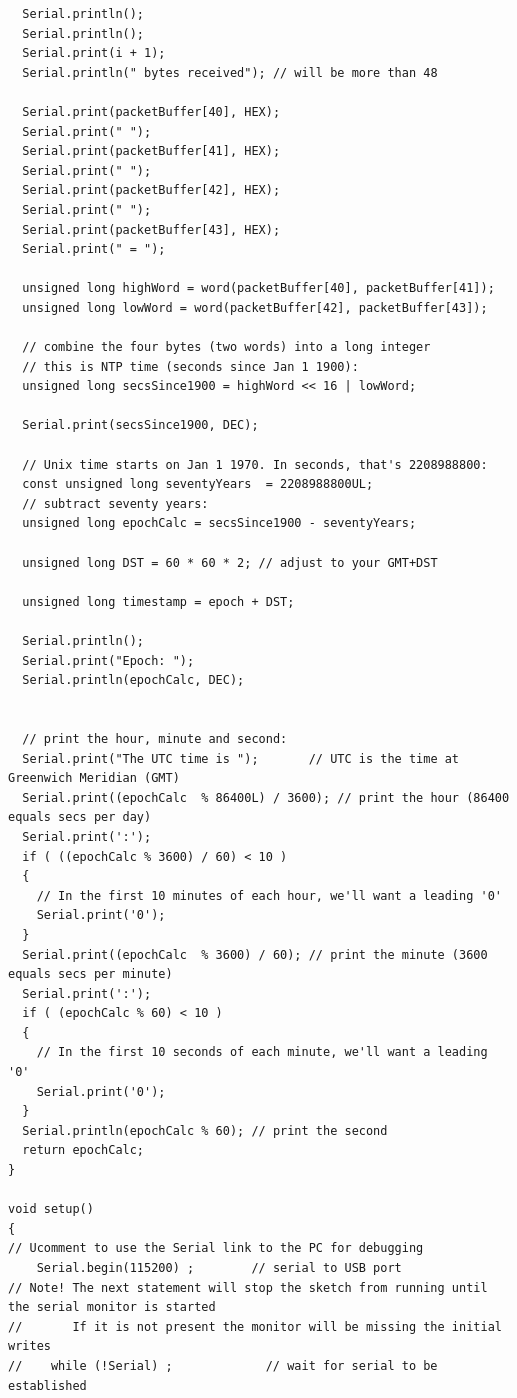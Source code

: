 \documentclass[12pt,a4paper]{report}
\begin{document}
\begin{lstlisting}
  Serial.println();
  Serial.println();
  Serial.print(i + 1);
  Serial.println(" bytes received"); // will be more than 48

  Serial.print(packetBuffer[40], HEX);
  Serial.print(" ");
  Serial.print(packetBuffer[41], HEX);
  Serial.print(" ");
  Serial.print(packetBuffer[42], HEX);
  Serial.print(" ");
  Serial.print(packetBuffer[43], HEX);
  Serial.print(" = ");

  unsigned long highWord = word(packetBuffer[40], packetBuffer[41]);
  unsigned long lowWord = word(packetBuffer[42], packetBuffer[43]);

  // combine the four bytes (two words) into a long integer
  // this is NTP time (seconds since Jan 1 1900):
  unsigned long secsSince1900 = highWord << 16 | lowWord;

  Serial.print(secsSince1900, DEC);

  // Unix time starts on Jan 1 1970. In seconds, that's 2208988800:
  const unsigned long seventyYears  = 2208988800UL;
  // subtract seventy years:
  unsigned long epochCalc = secsSince1900 - seventyYears;

  unsigned long DST = 60 * 60 * 2; // adjust to your GMT+DST

  unsigned long timestamp = epoch + DST;

  Serial.println();
  Serial.print("Epoch: ");
  Serial.println(epochCalc, DEC);


  // print the hour, minute and second:
  Serial.print("The UTC time is ");       // UTC is the time at Greenwich Meridian (GMT)
  Serial.print((epochCalc  % 86400L) / 3600); // print the hour (86400 equals secs per day)
  Serial.print(':');
  if ( ((epochCalc % 3600) / 60) < 10 )
  {
    // In the first 10 minutes of each hour, we'll want a leading '0'
    Serial.print('0');
  }
  Serial.print((epochCalc  % 3600) / 60); // print the minute (3600 equals secs per minute)
  Serial.print(':');
  if ( (epochCalc % 60) < 10 )
  {
    // In the first 10 seconds of each minute, we'll want a leading '0'
    Serial.print('0');
  }
  Serial.println(epochCalc % 60); // print the second
  return epochCalc;
}

void setup()
{
// Ucomment to use the Serial link to the PC for debugging
    Serial.begin(115200) ;        // serial to USB port
// Note! The next statement will stop the sketch from running until the serial monitor is started
//       If it is not present the monitor will be missing the initial writes
//    while (!Serial) ;             // wait for serial to be established


\end{lstlisting}
\end{document}
